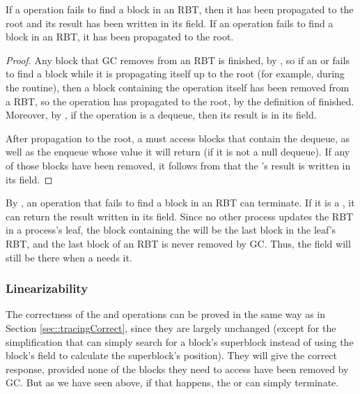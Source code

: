 \begin{lemma}\label{blocknotfound}
If a  operation fails to find a block in an RBT,
then it has been propagated to the root and its result has been written in its  field.
If an  operation fails to find a block in an RBT, it has been propagated to the root.
\end{lemma}
\begin{proof}
Any block that GC removes from an RBT is finished, by , so if an 
 or  fails to find a block while it is propagating itself up to
the root (for example, during the  routine), then a block containing
the operation itself has been removed from a RBT, so the operation has propagated to the root,
by the definition of finished.
Moreover, by , if the operation is a dequeue, then its result is in its  field.

After propagation to the root, a  must access blocks that contain the dequeue,
as well as the enqueue whose value it will return (if it is not a null dequeue).
If any of those blocks have been removed, it follows from  that the
's result is written in its  field.
\end{proof}

By , an operation that fails to find a block in an RBT can terminate.
If it is a , it can return the result written in its  field.
Since no other process updates the RBT in a process's leaf, the block containing the 
will be the last block in the leaf's RBT, and the last block of an RBT is never removed by GC.
Thus, the  field will still be there when a  needs it.

\subsubsection{Linearizability}

The correctness of the  and   operations
can be proved in the same way as in Section \ref{sec::tracingCorrect},
since they are largely unchanged (except for the simplification that 
can simply search for a block's superblock instead of using the block's  
field to calculate the superblock's position).
They will give the correct response, provided none of the blocks they need to access have been 
removed by GC.  But as we have seen above, if that happens, the  or  can simply terminate.

